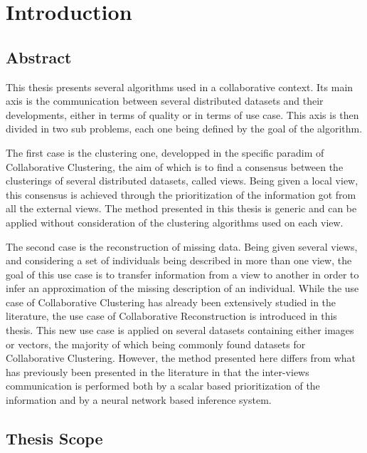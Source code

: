 \chapter{Introduction}

\minitoc{}
\newpage

\section{Abstract}

This thesis presents several algorithms used in a collaborative context. Its main axis is the communication between several distributed datasets and their developments, either in terms of quality or in terms of use case. This axis is then divided in two sub problems, each one being defined by the goal of the algorithm.

The first case is the clustering one, developped in the specific paradim of Collaborative Clustering, the aim of which is to find a consensus between the clusterings of several distributed datasets, called views. Being given a local view, this consensus is achieved through the prioritization of the information got from all the external views. The method presented in this thesis is generic and can be applied without consideration of the clustering algorithms used on each view.

The second case is the reconstruction of missing data. Being given several views, and considering a set of individuals being described in more than one view, the goal of this use case is to transfer information from a view to another in order to infer an approximation of the missing description of an individual. While the use case of Collaborative Clustering has already been extensively studied in the literature, the use case of Collaborative Reconstruction is introduced in this thesis. This new use case is applied on several datasets containing either images or vectors, the majority of which being commonly found datasets for Collaborative Clustering. However, the method presented here differs from what has previously been presented in the literature in that the inter-views communication is performed both by a scalar based prioritization of the information and by a neural network based inference system.

\section{Thesis Scope}

